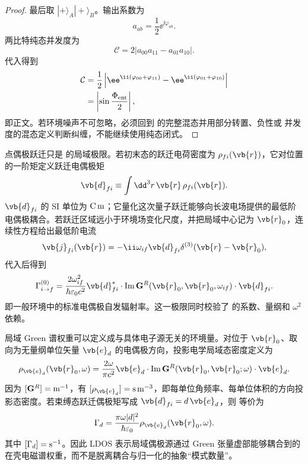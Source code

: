 \begin{proof}
最后取 $|+\rangle_A|+\rangle_B$。输出系数为
\[
a_{ab}=\frac12\ee^{\ii\varphi_{ab}}.
\]
两比特纯态并发度为
\[
\mathcal C=2|a_{00}a_{11}-a_{01}a_{10}|.
\]
代入得到
\begin{align*}
\mathcal C
&=\frac12\left|
\ee^{\ii(\varphi_{00}+\varphi_{11})}
-\ee^{\ii(\varphi_{01}+\varphi_{10})}
\right|\\
&=\left|\sin\frac{\Phi_{\rm ent}}2\right|,
\end{align*}
即正文。若环境噪声不可忽略，必须回到 的完整混态并用部分转置、负性或 并发度的混态定义判断纠缠，不能继续使用纯态闭式。
\end{proof}


点偶极跃迁只是 的局域极限。若初末态的跃迁电荷密度为 $\rho_{fi}(\vb{r})$，它对位置的一阶矩定义跃迁电偶极矩
\begin{equation*}
\vb{d}_{fi}
\equiv\int\dd^3 r\,\vb{r}\,\rho_{fi}(\vb{r}).
\end{equation*}
$\vb{d}_{fi}$ 的 SI 单位为 ${\rm C\,m}$；它量化这次量子跃迁能够向长波电场提供的最低阶电偶极耦合。若跃迁区域远小于环境场变化尺度，并把局域中心记为 $\vb{r}_0$，连续性方程给出最低阶电流
\[
\vb{j}_{fi}(\vb{r})
=-\ii\omega_{if}\vb{d}_{fi}\delta^{(3)}(\vb{r}-\vb{r}_0),
\]
代入后得到
\begin{equation}
{
\Gamma_{i\to f}^{(0)}
=\frac{2\omega_{if}^2}{\hbar\varepsilon_0c^2}
\vb{d}_{fi}^{*}\cdot
\operatorname{Im}\mathbf G^R(\vb{r}_0,\vb{r}_0,\omega_{if})\cdot
\vb{d}_{fi}.}
\label{eq:dipole_green_decay_rate}
\end{equation}
即一般环境中的标准电偶极自发辐射率。这一极限同时校验了 的系数、量纲和 $\omega^2$ 依赖。

局域 Green 谱权重可以定义成与具体电子源无关的环境量。对位于 $\vb{r}_0$、取向为无量纲单位矢量 $\vb{e}_d$ 的电偶极方向，投影电学局域态密度定义为
\begin{equation}
{
\rho_{\vb{e}_d}(\vb{r}_0,\omega)
=\frac{2\omega}{\pi c^2}
\vb{e}_d\cdot
\operatorname{Im}\mathbf G^R(\vb{r}_0,\vb{r}_0;\omega)
\cdot\vb{e}_d.}
\label{eq:projected_electric_ldos_definition}
\end{equation}
因为 $[\mathbf G^R]={\rm m^{-1}}$，有 $[\rho_{\vb{e}_d}]={\rm s\,m^{-3}}$，即每单位角频率、每单位体积的方向投影态密度。若束缚态跃迁偶极矩写成 $\vb{d}_{fi}=d\,\vb{e}_d$，则 等价为
\begin{equation}
{
\Gamma_d
=\frac{\pi\omega|d|^2}{\hbar\varepsilon_0}
\rho_{\vb{e}_d}(\vb{r}_0,\omega).}
\label{eq:dipole_decay_projected_ldos}
\end{equation}
其中 $[\Gamma_d]={\rm s^{-1}}$。因此 LDOS 表示局域偶极源通过 Green 张量虚部能够耦合到的在壳电磁谱权重，而不是脱离耦合与归一化的抽象“模式数量”。


